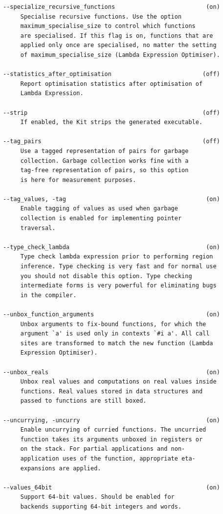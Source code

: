 \documentclass[12pt]{book}
\begin{document}
\begin{verbatim}
--specialize_recursive_functions                          (on)
     Specialise recursive functions. Use the option
     maximum_specialise_size to control which functions
     are specialised. If this flag is on, functions that are
     applied only once are specialised, no matter the setting
     of maximum_specialise_size (Lambda Expression Optimiser).

--statistics_after_optimisation                          (off)
     Report optimisation statistics after optimisation of
     Lambda Expression.

--strip                                                  (off)
     If enabled, the Kit strips the generated executable.

--tag_pairs                                              (off)
     Use a tagged representation of pairs for garbage
     collection. Garbage collection works fine with a
     tag-free representation of pairs, so this option
     is here for measurement purposes.

--tag_values, -tag                                        (on)
     Enable tagging of values as used when garbage
     collection is enabled for implementing pointer
     traversal.

--type_check_lambda                                       (on)
     Type check lambda expression prior to performing region
     inference. Type checking is very fast and for normal use
     you should not disable this option. Type checking
     intermediate forms is very powerful for eliminating bugs
     in the compiler.

--unbox_function_arguments                                (on)
     Unbox arguments to fix-bound functions, for which the
     argument `a' is used only in contexts `#i a'. All call
     sites are transformed to match the new function (Lambda
     Expression Optimiser).

--unbox_reals                                             (on)
     Unbox real values and computations on real values inside
     functions. Real values stored in data structures and
     passed to functions are still boxed.

--uncurrying, -uncurry                                    (on)
     Enable uncurrying of curried functions. The uncurried
     function takes its arguments unboxed in registers or
     on the stack. For partial applications and non-
     application uses of the function, appropriate eta-
     expansions are applied.

--values_64bit                                            (on)
     Support 64-bit values. Should be enabled for
     backends supporting 64-bit integers and words.


\end{verbatim}
\end{document}
